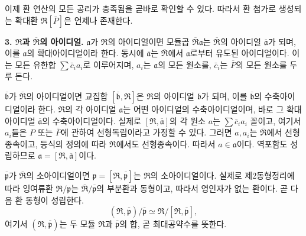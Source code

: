 이제 환 연산의 모든 공리가 충족됨을 곧바로 확인할 수 있다. 따라서 환 첨가로 생성되는 확대환 \(\mathfrak R[\overline P]\)은 언제나 존재한다.

\textbf{3. \(\mathfrak R\)과 \(\overline{\mathfrak R}\)의 아이디얼.} \(\mathfrak a\)가 \(\mathfrak R\)의 아이디얼이면 모듈곱 \(\overline{\mathfrak R}\mathfrak a\)는 \(\overline{\mathfrak R}\)의 아이디얼 \(\overline{\mathfrak a}\)가 되며, 이를 \(\mathfrak a\)의 확대아이디얼이라 한다. 동시에 \(\overline{\mathfrak a}\)는 \(\overline{\mathfrak R}\)에서 \(\mathfrak a\)로부터 유도된 아이디얼이다. 이는 모든 유한합 \(\sum\bar c_i a_i\)로 이루어지며, \(a_i\)는 \(\mathfrak a\)의 모든 원소를, \(\bar c_i\)는 \(\overline P\)의 모든 원소를 두루 돈다.

\(\overline{\mathfrak b}\)가 \(\overline{\mathfrak R}\)의 아이디얼이면 교집합 \([\overline{\mathfrak b},\mathfrak R]\)은 \(\mathfrak R\)의 아이디얼 \(\mathfrak b\)가 되며, 이를 \(\overline{\mathfrak b}\)의 수축아이디얼이라 한다. \(\mathfrak R\)의 각 아이디얼 \(\mathfrak a\)는 어떤 아이디얼의 수축아이디얼이며, 바로 그 확대아이디얼 \(\overline{\mathfrak a}\)의 수축아이디얼이다. 실제로 \([\mathfrak R,\overline{\mathfrak a}]\)의 각 원소 \(a\)는 \(\sum\bar c_i a_i\) 꼴이고, 여기서 \(a_i\)들은 \(P\) 또는 \(\overline P\)에 관하여 선형독립이라고 가정할 수 있다. 그러면 \(a,a_i\)는 \(\overline{\mathfrak R}\)에서 선형종속이고, 등식의 정의에 따라 \(\mathfrak R\)에서도 선형종속이다. 따라서 \(a\in\mathfrak a\)이다. 역포함도 성립하므로 \(\mathfrak a=[\mathfrak R,\overline{\mathfrak a}]\)이다.

\(\overline{\mathfrak p}\)가 \(\overline{\mathfrak R}\)의 소아이디얼이면 \(\mathfrak p=[\mathfrak R,\overline{\mathfrak p}]\)는 \(\mathfrak R\)의 소아이디얼이다. 실제로 제2동형정리에 따라 잉여류환 \(\mathfrak R/\mathfrak p\)는 \(\overline{\mathfrak R}/\overline{\mathfrak p}\)의 부분환과 동형이고, 따라서 영인자가 없는 환이다. 곧 다음 환 동형이 성립한다.
\[
   (\mathfrak R,\overline{\mathfrak p})/\overline{\mathfrak p}
     \simeq \mathfrak R/[\mathfrak R,\overline{\mathfrak p}],
\]
여기서 \((\mathfrak R,\overline{\mathfrak p})\)는 두 모듈 \(\mathfrak R\)과 \(\overline{\mathfrak p}\)의 합, 곧 최대공약수를 뜻한다.

